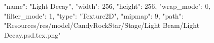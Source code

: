 {
  "name": "Light Decay",
  "width": 256,
  "height": 256,
  "wrap_mode": 0,
  "filter_mode": 1,
  "type": "Texture2D",
  "mipmap": 9,
  "path": "Resources/res/model/CandyRockStar/Stage/Light Beam/Light Decay.psd.tex.png"
}